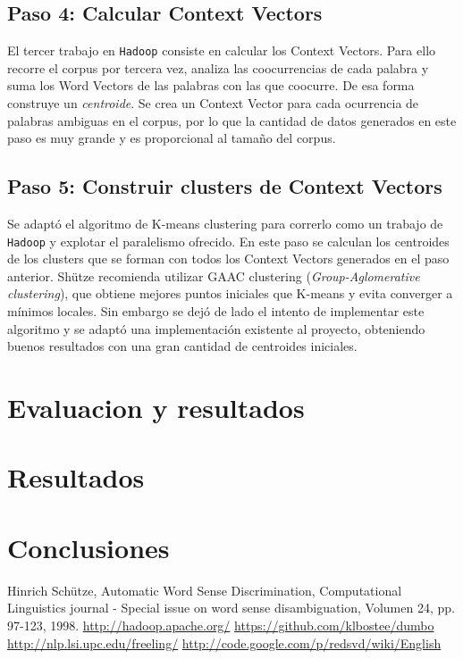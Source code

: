 \documentclass[11pt]{article}
\begin{document}
\subsection{Paso 4: Calcular Context Vectors}
El tercer trabajo en \texttt{Hadoop} consiste en calcular los Context Vectors. Para ello recorre el corpus por tercera vez, analiza las coocurrencias de cada palabra y suma los Word Vectors de las palabras con las que coocurre. De esa forma construye un \emph{centroide}.
Se crea un Context Vector para cada ocurrencia de palabras ambiguas en el corpus, por lo que la cantidad de datos generados en este paso es muy grande y es proporcional al tamaño del corpus. 
\subsection{Paso 5: Construir clusters de Context Vectors}
Se adaptó el algoritmo de K-means clustering para correrlo como un trabajo de \texttt{Hadoop} y explotar el paralelismo ofrecido.
En este paso se calculan los centroides de los clusters que se forman con todos los Context Vectors generados en el paso anterior.
Shütze recomienda utilizar GAAC clustering (\emph{Group-Aglomerative clustering}), que obtiene mejores puntos iniciales que K-means y evita converger a mínimos locales.
Sin embargo se dejó de lado el intento de implementar este algoritmo y se adaptó una implementación existente al proyecto, obteniendo buenos resultados con una gran cantidad de centroides iniciales.

\section{Evaluacion y resultados}
\section{Resultados}


\section{Conclusiones}

\begin{thebibliography}{99}

 Hinrich Schütze, Automatic Word Sense Discrimination, Computational Linguistics journal - Special issue on word sense disambiguation, Volumen 24, pp. 97-123, 1998.
 \url{http://hadoop.apache.org/}
 \url{https://github.com/klbostee/dumbo}
 \url{http://nlp.lsi.upc.edu/freeling/}
 \url{http://code.google.com/p/redsvd/wiki/English}
\end{thebibliography}
\end{document}
